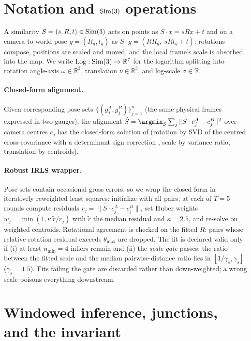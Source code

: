 \section{Notation and $\mathrm{Sim}(3)$ operations}
\label{app:sim3}
A similarity $S=(s,R,t)\in\mathrm{Sim}(3)$ acts on points as $S\cdot x = sRx+t$
and on a camera-to-world pose $g=(R_g,t_g)$ as
$S\cdot g = (R R_g,\; sRt_g + t)$: rotations compose, positions are scaled
and moved, and the local frame's scale is absorbed into the map. We write
$\mathrm{Log}:\mathrm{Sim}(3)\to\mathbb{R}^7$ for the logarithm splitting into
rotation angle-axis $\omega\in\mathbb{R}^3$, translation $\nu\in\mathbb{R}^3$,
and log-scale $\sigma\in\mathbb{R}$.

\paragraph{Closed-form alignment.}
Given corresponding pose sets $\{(g_j^{A}, g_j^{B})\}_{j=1}^{n}$ (the same
physical frames expressed in two gauges), the alignment
$\hat S=\argmin_S \sum_j \|S\cdot c_j^{A} - c_j^{B}\|^2$ over camera
centres $c_j$ has the closed-form solution of \citet{umeyama} (rotation by
SVD of the centred cross-covariance with a determinant sign correction
\citep{horn}, scale by variance ratio, translation by centroids).

\paragraph{Robust IRLS wrapper.}
Pose sets contain occasional gross errors, so we wrap the closed form in
iteratively reweighted least squares: initialize with all pairs; at each of
$T{=}5$ rounds compute residuals $r_j = \|\hat S\cdot c^A_j - c^B_j\|$,
set Huber weights $w_j=\min(1, \kappa\,\tilde r/r_j)$ with $\tilde r$ the
median residual and $\kappa{=}2.5$, and re-solve on weighted centroids.
Rotational agreement is checked on the fitted $R$: pairs whose relative
rotation residual exceeds $\theta_{\max}$ are dropped. The fit is declared
valid only if (i) at least $n_{\min}{=}4$ inliers remain and (ii) the
\emph{scale gate} passes: the ratio between the fitted scale and the
median pairwise-distance ratio lies in $[1/\gamma_s,\gamma_s]$
($\gamma_s{=}1.5$). Fits failing the gate are discarded rather than
down-weighted; a wrong scale poisons everything downstream.

\section{Windowed inference, junctions, and the invariant}
\label{app:invariant}
